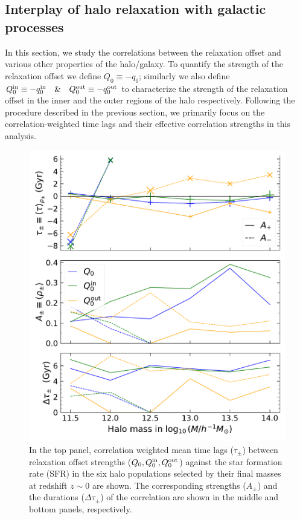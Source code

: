 \subsection{Interplay of halo relaxation with galactic processes}
\label{sec:main-res-halgal-relxn}
In this section, we study the correlations between the relaxation offset and various other properties of the halo/galaxy. To quantify the strength of the relaxation offset we define $Q_0 \equiv -q_0$; similarly we also define $Q_0^{\rm{in}}\equiv -q_0^{\rm{in}} \quad \& \quad  Q_0^{\rm{out}}\equiv -q_0^{\rm{out}}$ to characterize the strength of the relaxation offset in the inner and the outer regions of the halo respectively. Following the procedure described in the previous section, we primarily focus on the correlation-weighted time lags and their effective correlation strengths in this analysis.

\begin{figure}[htbp]
\centering
\includegraphics[width=.69\linewidth]{plots/dynam_relxn/shift_betw_multi-SFR_fullcorr.pdf}
\caption{In the top panel, correlation weighted mean time lags ($\tau_{\pm}$) between relaxation offset strengths ($Q_0, Q_0^{\rm{in}}, Q_0^{\rm{out}}$) against the star formation rate (SFR) in the six halo populations selected by their final masses at redshift $z\sim 0$ are shown. The corresponding strengths ($A_{\pm}$) and the durations ($\Delta \tau_{\pm}$) of the correlation are shown in the middle and bottom panels, respectively.}
\label{fig:dynam-correl-q0-SFR-timeshift-func}
\end{figure}

